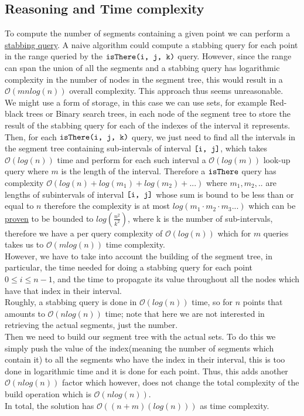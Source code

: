 \documentclass[a4paper,12pt]{article}
\begin{document}
\subsection{Reasoning and Time complexity}

To compute the number of segments containing a given point we can perform a \href{https://archive.org/details/computationalgeo00berg}{stabbing query}.
A naive algorithm could compute a stabbing query for each point in the range queried by the $\verb|isThere(i, j, k)|$ query. However, since the range can span the union of all the segments and a stabbing query has logarithmic complexity in the number of nodes in the segment tree, this would result in a $\mathcal{O}(mnlog(n))$ overall complexity. This approach thus seems unreasonable. \\ We might use a form of storage, in this case we can use sets, for example Red-black trees or Binary search trees, in each node of the segment tree to store the result of the stabbing query for each of the indexes of the interval it represents. Then, for each $\verb|isThere(i, j, k)|$ query, we just need to find all the intervals in the segment tree containing sub-intervals of interval $\verb|[i, j]|$, which takes $\mathcal{O}(log(n))$ time and perform for each such interval a $\mathcal{O}(log(m))$ look-up query where $m$ is the length of the interval. Therefore a $\verb|isThere|$ query has complexity $\mathcal{O}(log(n) + log(m_1)+ log(m_2)+...)$ where $m_1, m_2,..$ are lengths of subintervals of interval $\verb|[i, j]|$ whose sum is bound to be less than or equal to $n$ therefore the complexity is at most $log(m_1\cdot m_2\cdot m_3...)$ which can be \href{https://en.wikipedia.org/wiki/AM%E2%80%93GM_inequality}{proven} to be bounded to $log(\frac{n^2}{k^2})$, where k is the number of sub-intervals, therefore we have a per query complexity of $\mathcal{O}(log(n))$ which for $m$ queries takes us to $\mathcal{O}(mlog(n))$ time complexity.\\
However, we have to take into account the building of the segment tree, in particular, the time needed for doing a stabbing query for each point $0 \le i \le n-1$, and the time to propagate its value throughout all the nodes which have that index in their interval. \\
Roughly, a stabbing query is done in $\mathcal{O}(log(n))$ time, so for $n$ points that amounts to $\mathcal{O}(nlog(n))$ time; note that here we are not interested in retrieving the actual segments, just the number. \\
Then we need to build our segment tree with the actual sets. To do this we simply push the value of the index(meaning the number of segments which contain it) to all the segments who have the index in their interval, this is too done in logarithmic time and it is done for each point. Thus, this adds another $\mathcal{O}(nlog(n))$ factor which however, does not change the total complexity of the build operation which is $\mathcal{O}(nlog(n))$.\\
In total, the solution has $\mathcal{O}((n+m)(log(n)))$ as time complexity.
\end{document}
